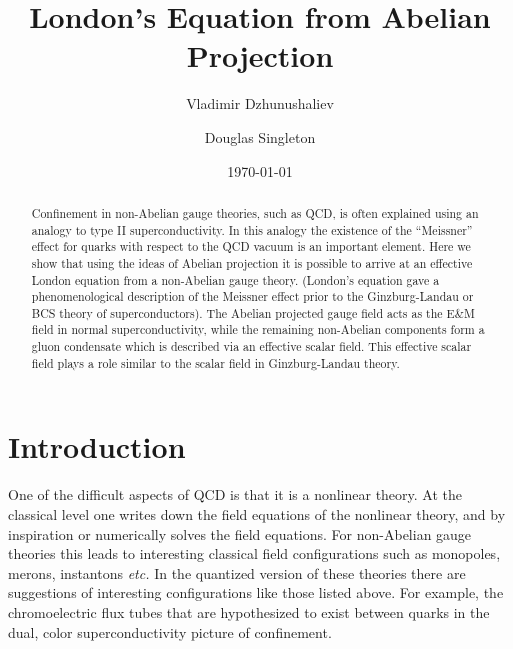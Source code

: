 \documentclass[a4paper,aps,showpacs]{revtex4}
\begin{document}
\title{London's Equation from Abelian Projection}
\author{Vladimir Dzhunushaliev}
\author{Douglas Singleton}

\date{\today}

\begin{abstract}
Confinement in non-Abelian gauge theories, such as QCD,
is often explained using an analogy to type II
superconductivity. In this analogy the existence of the
``Meissner'' effect for quarks with respect to the QCD vacuum
is an important element. Here we show
that using the ideas of Abelian projection it is possible to arrive
at an effective London equation from a non-Abelian gauge theory.
(London's equation gave a phenomenological description of
the Meissner effect prior to the Ginzburg-Landau
or BCS theory of superconductors). The
Abelian projected gauge field acts as the E\&M field in normal
superconductivity, while the remaining non-Abelian components
form a gluon condensate which is described via an effective scalar
field. This effective scalar field plays a role similar
to the scalar field in Ginzburg-Landau theory.
\end{abstract}


\maketitle

\section{Introduction}

One of the difficult aspects of QCD is that it
is a nonlinear theory. At the classical level one writes down
the field equations of the nonlinear theory, and by inspiration
or numerically solves the field equations. For non-Abelian gauge
theories this leads to interesting classical field configurations
such as monopoles, merons, instantons {\it etc.}
In the quantized version of these theories there are
suggestions of interesting configurations like those
listed above. For example, the chromoelectric flux tubes
that are hypothesized to exist between quarks in the dual,
color superconductivity picture of confinement.
\end{document}

